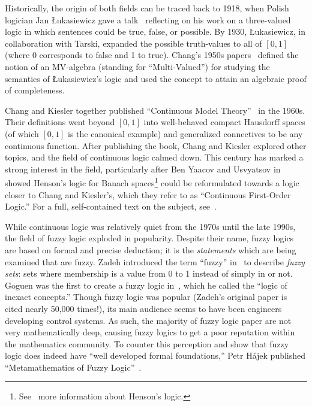 \documentclass{amsart}
\theoremstyle{definition}
\numberwithin{equation}{theorem}
\begin{document}
Historically, the origin of both fields can be traced back to 1918, when Polish logician Jan {\L}ukasiewicz gave a talk~\cite{lukasiewicz1918farewell} reflecting on his work on a three-valued logic in which sentences could be true, false, or possible.
By 1930, {\L}ukasiewicz, in collaboration with Tarski, expanded the possible truth-values to all of $[0,1]$ (where 0 corresponds to false and 1 to true).
Chang's 1950s papers~\cite{chang1958algebraic,chang1959new} defined the notion of an MV-algebra (standing for ``Multi-Valued'') for studying the semantics of {\L}ukasiewicz's logic and used the concept to attain an algebraic proof of completeness.

Chang and Kiesler together published ``Continuous Model Theory''~\cite{chang1966continuous} in the 1960s.
Their definitions went beyond $[0,1]$ into well-behaved compact Hausdorff spaces (of which $[0,1]$ is the canonical example) and generalized connectives to be any continuous function.
After publishing the book, Chang and Kiesler explored other topics, and the field of continuous logic calmed down.
This century has marked a strong interest in the field, particularly after Ben Yaacov and Usvyatsov in~\cite{ben2010continuous} showed Henson's logic for Banach spaces\footnote{See~\cite{henson2002ultraproducts} more information about Henson's logic.} could be reformulated towards a logic closer to Chang and Kiesler's, which they refer to as ``Continuous First-Order Logic.''
For a full, self-contained text on the subject, see~\cite{yaacov2008model}.

While continuous logic was relatively quiet from the 1970s until the late 1990s, the field of fuzzy logic exploded in popularity.
Despite their name, fuzzy logics are based on formal and precise deduction; it is the \emph{statements} which are being examined that are fuzzy.
Zadeh introduced the term ``fuzzy'' in~\cite{zadeh1965fuzzy} to describe \emph{fuzzy sets}: sets where membership is a value from 0 to 1 instead of simply in or not.
Goguen was the first to create a fuzzy logic in~\cite{goguen1969logic}, which he called the ``logic of inexact concepts.''
Though fuzzy logic was popular (Zadeh's original paper is cited nearly 50,000 times!), its main audience seems to have been engineers developing control systems.
As such, the majority of fuzzy logic paper are not very mathematically deep, causing fuzzy logics to get a poor reputation within the mathematics community.
To counter this perception and show that fuzzy logic does indeed have ``well developed formal foundations,'' Petr H\'ajek published ``Metamathematics of Fuzzy Logic''~\cite{hajek1998metamathematics}.
\end{document}
